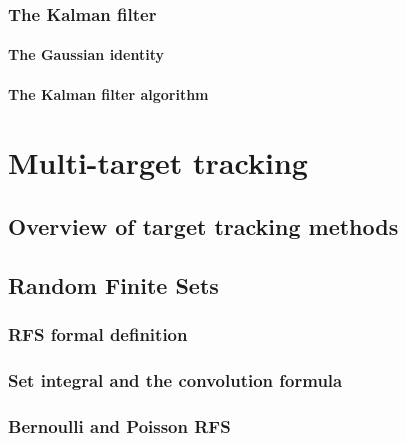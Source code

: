 \documentclass[english,master,unicode]{ctufit-thesis}
\theoremstyle{plain}
\theoremstyle{definition}
\theoremstyle{remark}
\numberwithin{theorem}{chapter}
\begin{document}
        \subsection{The Kalman filter}\label{sec:kf-index}
            
            \subsubsection{The Gaussian identity}\label{sec:gaussian-identity}
                
            \subsubsection{The Kalman filter algorithm}\label{sec:kf-algorithm}
                


\chapter{Multi-target tracking}\label{ch:mtt}
    
    \section{Overview of target tracking methods}\label{sec:tt-overview}
        
    \section{Random Finite Sets}\label{sec:fisst}
        
        \subsection{RFS formal definition}\label{sec:rfs-definition}
            
        \subsection{Set integral and the convolution formula}\label{sec:rfs-integral-convolution}
            
        \subsection{Bernoulli and Poisson RFS}\label{sec:bernoulli-poisson-rfs}
            
\end{document}
